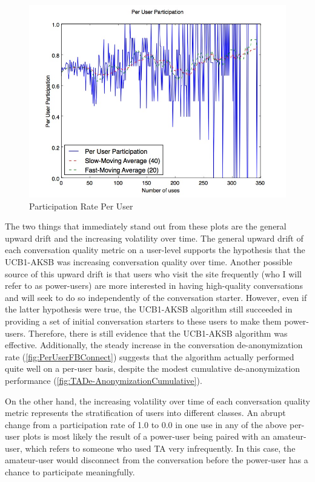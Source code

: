 \begin{figure}[H]
\centering
\includegraphics[trim= 0mm 0mm 0mm 0mm, clip, scale=0.5]{./Figures/PerUserParticipation.jpg}
\caption{Participation Rate Per User}
\label{fig:PerUserParticipation}
\end{figure}

The two things that immediately stand out from these plots are the general upward drift and the increasing volatility over time. The general upward drift of each conversation quality metric on a user-level supports the hypothesis that the UCB1-AKSB was increasing conversation quality over time. Another possible source of this upward drift is that users who visit the site frequently (who I will refer to as power-users) are more interested in having high-quality conversations and will seek to do so independently of the conversation starter. However, even if the latter hypothesis were true, the UCB1-AKSB algorithm still succeeded in providing a set of initial conversation starters to these users to make them power-users. Therefore, there is still evidence that the UCB1-AKSB algorithm was effective. Additionally, the steady increase in the conversation de-anonymization rate (\autoref{fig:PerUserFBConnect}) suggests that the algorithm actually performed quite well on a per-user basis, despite the modest cumulative de-anonymization performance (\autoref{fig:TADe-AnonymizationCumulative}).

On the other hand, the increasing volatility over time of each conversation quality metric represents the stratification of users into different classes. An abrupt change from a participation rate of 1.0 to 0.0 in one use in any of the above per-user plots is most likely the result of a power-user being paired with an amateur-user, which refers to someone who used TA very infrequently. In this case, the amateur-user would disconnect from the conversation before the power-user has a chance to participate meaningfully.


